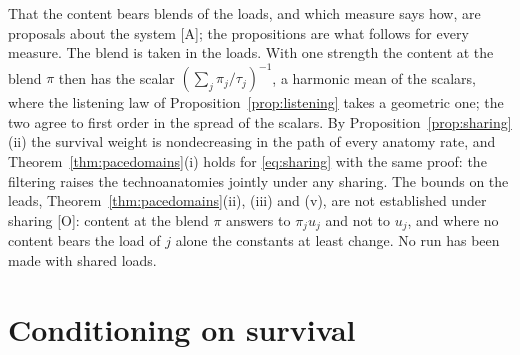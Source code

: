 \begin{remark}\label{rem:sharingscope}
That the content bears blends of the loads, and which measure says how,
are proposals about the system [A]; the propositions are what follows
for every measure. The blend is taken in the loads. With one strength the
content at the blend $\pi$ then has the scalar
$(\sum_j\pi_j/\tau_j)^{-1}$, a harmonic mean of the scalars, where the
listening law of Proposition~\ref{prop:listening} takes a geometric one;
the two agree to first order in the spread of the scalars. By
Proposition~\ref{prop:sharing}(ii) the survival weight is nondecreasing
in the path of every anatomy rate, and
Theorem~\ref{thm:pacedomains}(i) holds for \eqref{eq:sharing} with the
same proof: the filtering raises the technoanatomies jointly under any
sharing. The bounds on the leads, Theorem~\ref{thm:pacedomains}(ii),
(iii) and (v), are not established under sharing [O]: content at the
blend $\pi$ answers to $\pi_ju_j$ and not to $u_j$, and where no content
bears the load of $j$ alone the constants at least change. No run has
been made with shared loads.
\end{remark}

\section{Conditioning on survival}\label{sec:cond}

